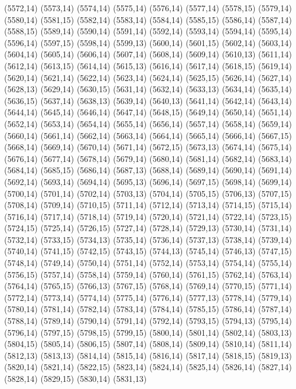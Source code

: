 (5572,14)
(5573,14)
(5574,14)
(5575,14)
(5576,14)
(5577,14)
(5578,15)
(5579,14)
(5580,14)
(5581,15)
(5582,14)
(5583,14)
(5584,14)
(5585,15)
(5586,14)
(5587,14)
(5588,15)
(5589,14)
(5590,14)
(5591,14)
(5592,14)
(5593,14)
(5594,14)
(5595,14)
(5596,14)
(5597,15)
(5598,14)
(5599,13)
(5600,14)
(5601,15)
(5602,14)
(5603,14)
(5604,14)
(5605,14)
(5606,14)
(5607,14)
(5608,14)
(5609,14)
(5610,13)
(5611,14)
(5612,14)
(5613,15)
(5614,14)
(5615,13)
(5616,14)
(5617,14)
(5618,15)
(5619,14)
(5620,14)
(5621,14)
(5622,14)
(5623,14)
(5624,14)
(5625,15)
(5626,14)
(5627,14)
(5628,13)
(5629,14)
(5630,15)
(5631,14)
(5632,14)
(5633,13)
(5634,14)
(5635,14)
(5636,15)
(5637,14)
(5638,13)
(5639,14)
(5640,13)
(5641,14)
(5642,14)
(5643,14)
(5644,14)
(5645,14)
(5646,14)
(5647,14)
(5648,15)
(5649,14)
(5650,14)
(5651,14)
(5652,14)
(5653,14)
(5654,14)
(5655,14)
(5656,14)
(5657,14)
(5658,14)
(5659,14)
(5660,14)
(5661,14)
(5662,14)
(5663,14)
(5664,14)
(5665,14)
(5666,14)
(5667,15)
(5668,14)
(5669,14)
(5670,14)
(5671,14)
(5672,15)
(5673,13)
(5674,14)
(5675,14)
(5676,14)
(5677,14)
(5678,14)
(5679,14)
(5680,14)
(5681,14)
(5682,14)
(5683,14)
(5684,14)
(5685,15)
(5686,14)
(5687,13)
(5688,14)
(5689,14)
(5690,14)
(5691,14)
(5692,14)
(5693,14)
(5694,14)
(5695,13)
(5696,14)
(5697,15)
(5698,14)
(5699,14)
(5700,14)
(5701,14)
(5702,14)
(5703,13)
(5704,14)
(5705,15)
(5706,13)
(5707,15)
(5708,14)
(5709,14)
(5710,15)
(5711,14)
(5712,14)
(5713,14)
(5714,15)
(5715,14)
(5716,14)
(5717,14)
(5718,14)
(5719,14)
(5720,14)
(5721,14)
(5722,14)
(5723,15)
(5724,15)
(5725,14)
(5726,15)
(5727,14)
(5728,14)
(5729,13)
(5730,14)
(5731,14)
(5732,14)
(5733,15)
(5734,13)
(5735,14)
(5736,14)
(5737,13)
(5738,14)
(5739,14)
(5740,14)
(5741,15)
(5742,15)
(5743,15)
(5744,13)
(5745,14)
(5746,13)
(5747,15)
(5748,14)
(5749,14)
(5750,14)
(5751,14)
(5752,14)
(5753,14)
(5754,14)
(5755,14)
(5756,15)
(5757,14)
(5758,14)
(5759,14)
(5760,14)
(5761,15)
(5762,14)
(5763,14)
(5764,14)
(5765,15)
(5766,13)
(5767,15)
(5768,14)
(5769,14)
(5770,15)
(5771,14)
(5772,14)
(5773,14)
(5774,14)
(5775,14)
(5776,14)
(5777,13)
(5778,14)
(5779,14)
(5780,14)
(5781,14)
(5782,14)
(5783,14)
(5784,14)
(5785,15)
(5786,14)
(5787,14)
(5788,14)
(5789,14)
(5790,14)
(5791,14)
(5792,14)
(5793,15)
(5794,13)
(5795,14)
(5796,14)
(5797,15)
(5798,15)
(5799,15)
(5800,14)
(5801,14)
(5802,14)
(5803,13)
(5804,15)
(5805,14)
(5806,15)
(5807,14)
(5808,14)
(5809,14)
(5810,14)
(5811,14)
(5812,13)
(5813,13)
(5814,14)
(5815,14)
(5816,14)
(5817,14)
(5818,15)
(5819,13)
(5820,14)
(5821,14)
(5822,15)
(5823,14)
(5824,14)
(5825,14)
(5826,14)
(5827,14)
(5828,14)
(5829,15)
(5830,14)
(5831,13)
